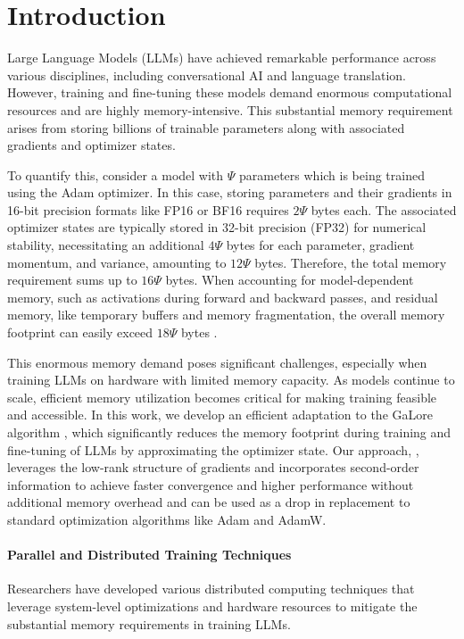 
\vspace{-8mm}
\section{Introduction}
Large Language Models (LLMs) have achieved remarkable performance across various disciplines, including conversational AI and language translation. However, training and fine-tuning these models demand enormous computational resources and are highly memory-intensive. This substantial memory requirement arises from storing billions of trainable parameters along with associated gradients and optimizer states.

To quantify this, consider a model with $\Psi$ parameters which is being trained using the Adam optimizer. In this case, storing parameters and their gradients in 16-bit precision formats like FP16 or BF16 requires $2\Psi$ bytes each. The associated optimizer states are typically stored in 32-bit precision (FP32) for numerical stability, necessitating an additional $4\Psi$ bytes for each parameter, gradient momentum, and variance, amounting to $12\Psi$ bytes. Therefore, the total memory requirement sums up to $16\Psi$ bytes. When accounting for model-dependent memory, such as activations during forward and backward passes, and residual memory, like temporary buffers and memory fragmentation, the overall memory footprint can easily exceed $18\Psi$ bytes \citep{raffelExploringLimitsTransfer2020,touvronLlamaOpenFoundation2023,chowdheryPaLMScalingLanguage2022}.

This enormous memory demand poses significant challenges, especially when training LLMs on hardware with limited memory capacity. As models continue to scale, efficient memory utilization becomes critical for making training feasible and accessible. In this work, we develop an efficient adaptation to the GaLore algorithm \citep{zhao2024galore}, which significantly reduces the memory footprint during training and fine-tuning of LLMs by approximating the optimizer state. Our approach, \textit{\lowrank}, leverages the low-rank structure of gradients and incorporates second-order information to achieve faster convergence and higher performance without additional memory overhead and can be used as a drop in replacement to standard optimization algorithms like Adam and AdamW.

\paragraph{Parallel and Distributed Training Techniques}
Researchers have developed various distributed computing techniques that leverage system-level optimizations and hardware resources to mitigate the substantial memory requirements in training LLMs.

